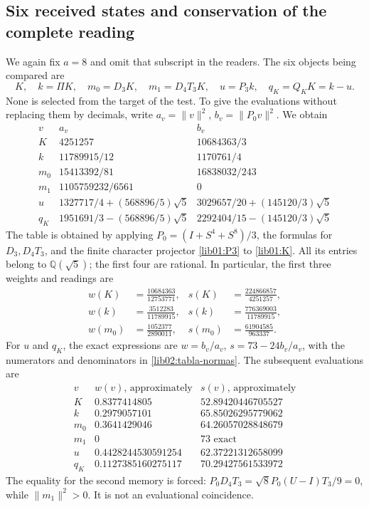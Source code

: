 \subsection{Six received states and conservation of the complete reading}
\label{lib02:seis-estados}

We again fix \(a=8\) and omit that subscript in the readers. The six objects being compared are
\[
 K,\quad k=\Pi K,\quad m_0=D_3K,\quad m_1=D_4T_3K,
 \quad u=P_3k,\quad q_K=Q_KK=k-u.
\]
None is selected from the target of the test. To give the evaluations without replacing them by decimals, write \(a_v=\|v\|^2\), \(b_v=\|P_0v\|^2\). We obtain
\begin{equation}
\begin{array}{c|c|c}
 v&a_v&b_v\\\hline
 K&4251257&10684363/3\\
 k&11789915/12&1170761/4\\
 m_0&15413392/81&16838032/243\\
 m_1&1105759232/6561&0\\
 u&1327717/4+(568896/5)\sqrt5
   &3029657/20+(145120/3)\sqrt5\\
 q_K&1951691/3-(568896/5)\sqrt5
   &2292404/15-(145120/3)\sqrt5
\end{array}
 \label{lib02:tabla-normas}
\end{equation}
The table is obtained by applying \(P_0=(I+S^4+S^8)/3\), the formulas for \(D_3,D_4T_3\), and the finite character projector \eqref{lib01:P3} to \eqref{lib01:K}. All its entries belong to \(\mathbb Q(\sqrt5)\); the first four are rational. In particular, the first three weights and readings are
\begin{align*}
 w(K)&=\frac{10684363}{12753771},&
 s(K)&=\frac{224866857}{4251257},\\
 w(k)&=\frac{3512283}{11789915},&
 s(k)&=\frac{776369003}{11789915},\\
 w(m_0)&=\frac{1052377}{2890011},&
 s(m_0)&=\frac{61904585}{963337}.
\end{align*}
For \(u\) and \(q_K\), the exact expressions are \(w=b_v/a_v\), \(s=73-24b_v/a_v\), with the numerators and denominators in \eqref{lib02:tabla-normas}. The subsequent evaluations are
\[
\begin{array}{c|c|c}
 v&w(v)\text{, approximately}&s(v)\text{, approximately}\\\hline
 K&0.8377414805&52.89420446705527\\
 k&0.2979057101&65.85026295779062\\
 m_0&0.3641429046&64.26057028848679\\
 m_1&0&73\text{ exact}\\
 u&0.4428244530591254&62.37221312658099\\
 q_K&0.1127385160275117&70.29427561533972
\end{array}
\]
The equality for the second memory is forced: \(P_0D_4T_3=\sqrt8P_0(U-I)T_3/9=0\), while \(\|m_1\|^2>0\). It is not an evaluational coincidence.

